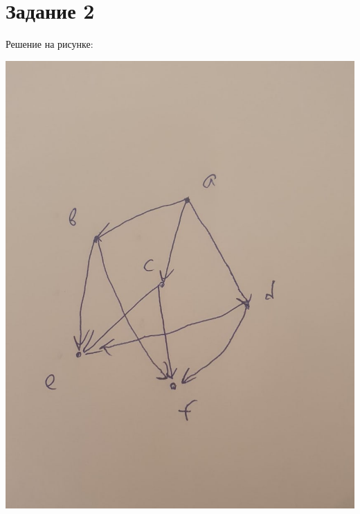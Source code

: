 \documentclass[a4paper,12pt]{article}
\begin{document}
\section*{Задание 2}
Решение на рисунке:
\begin{center}
\includegraphics[scale=0.4]{65AQJAscBXI.jpg}
\end{center}
\newpage
\end{document}
